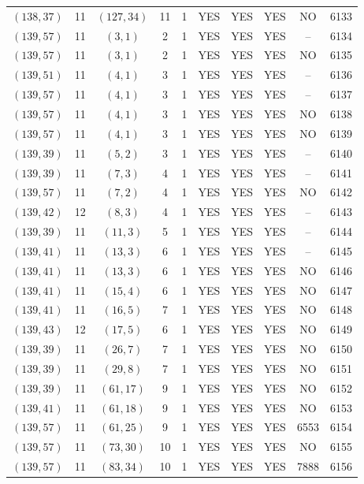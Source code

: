 \begin{longtable}{|c|c|c|c|c|c|c|c|c|c|}
$(138, 37)$ & 11 & $(127, 34)$ & 11 & 1 & YES & YES & YES & NO & 6133\\
$(139, 57)$ & 11 & $(3, 1)$ & 2 & 1 & YES & YES & YES & -- & 6134\\
$(139, 57)$ & 11 & $(3, 1)$ & 2 & 1 & YES & YES & YES & NO & 6135\\
$(139, 51)$ & 11 & $(4, 1)$ & 3 & 1 & YES & YES & YES & -- & 6136\\
$(139, 57)$ & 11 & $(4, 1)$ & 3 & 1 & YES & YES & YES & -- & 6137\\
$(139, 57)$ & 11 & $(4, 1)$ & 3 & 1 & YES & YES & YES & NO & 6138\\
$(139, 57)$ & 11 & $(4, 1)$ & 3 & 1 & YES & YES & YES & NO & 6139\\
$(139, 39)$ & 11 & $(5, 2)$ & 3 & 1 & YES & YES & YES & -- & 6140\\
$(139, 39)$ & 11 & $(7, 3)$ & 4 & 1 & YES & YES & YES & -- & 6141\\
$(139, 57)$ & 11 & $(7, 2)$ & 4 & 1 & YES & YES & YES & NO & 6142\\
$(139, 42)$ & 12 & $(8, 3)$ & 4 & 1 & YES & YES & YES & -- & 6143\\
$(139, 39)$ & 11 & $(11, 3)$ & 5 & 1 & YES & YES & YES & -- & 6144\\
$(139, 41)$ & 11 & $(13, 3)$ & 6 & 1 & YES & YES & YES & -- & 6145\\
$(139, 41)$ & 11 & $(13, 3)$ & 6 & 1 & YES & YES & YES & NO & 6146\\
$(139, 41)$ & 11 & $(15, 4)$ & 6 & 1 & YES & YES & YES & NO & 6147\\
$(139, 41)$ & 11 & $(16, 5)$ & 7 & 1 & YES & YES & YES & NO & 6148\\
$(139, 43)$ & 12 & $(17, 5)$ & 6 & 1 & YES & YES & YES & NO & 6149\\
$(139, 39)$ & 11 & $(26, 7)$ & 7 & 1 & YES & YES & YES & NO & 6150\\
$(139, 39)$ & 11 & $(29, 8)$ & 7 & 1 & YES & YES & YES & NO & 6151\\
$(139, 39)$ & 11 & $(61, 17)$ & 9 & 1 & YES & YES & YES & NO & 6152\\
$(139, 41)$ & 11 & $(61, 18)$ & 9 & 1 & YES & YES & YES & NO & 6153\\
$(139, 57)$ & 11 & $(61, 25)$ & 9 & 1 & YES & YES & YES & 6553 & 6154\\
$(139, 57)$ & 11 & $(73, 30)$ & 10 & 1 & YES & YES & YES & NO & 6155\\
$(139, 57)$ & 11 & $(83, 34)$ & 10 & 1 & YES & YES & YES & 7888 & 6156\\

\end{longtable}
